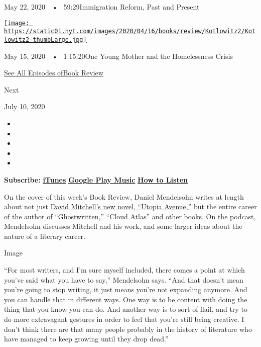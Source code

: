 May 22, 2020~~•~ 59:29Immigration Reform, Past and Present

\href{https://www.nytimes.com/2020/05/15/books/review/podcast-lauren-sandler-this-is-all-i-got-sarah-weinman-crime-fiction.html?action=click\&module=audio-series-bar\&region=header\&pgtype=Article}{\texttt{[image: https://static01.nyt.com/images/2020/04/16/books/review/Kotlowitz2/Kotlowitz2-thumbLarge.jpg]}}

May 15, 2020~~•~ 1:15:20One Young Mother and the Homelessness Crisis

\href{https://www.nytimes.com/column/book-review-podcast}{See All
Episodes ofBook Review}

Next

July 10, 2020

\begin{itemize}
\item
\item
\item
\item
\item
\end{itemize}

\textbf{Subscribe:}
\textbf{\href{https://itunes.apple.com/us/podcast/book-review/id120315179?mt=2}{iTunes}}
\textbf{\textbar{}}
\textbf{\href{https://play.google.com/music/listen?u=0\#/ps/Iv6zeb5qwjtzjfbyo3vy5zny5ky}{Google
Play Music}} \textbf{\textbar{}}
\textbf{\href{https://www.nytimes.com/2018/08/03/books/review/how-to-listen-to-the-book-review-podcast.html}{How
to Listen}}

On the cover of this week's Book Review, Daniel Mendelsohn writes at
length about not just
\href{https://www.nytimes.com/2020/07/10/books/review/utopia-avenue-david-mitchell.html}{David
Mitchell's new novel, ``Utopia Avenue,''} but the entire career of the
author of ``Ghostwritten,'' ``Cloud Atlas'' and other books. On the
podcast, Mendelsohn discusses Mitchell and his work, and some larger
ideas about the nature of a literary career.

Image

``For most writers, and I'm sure myself included, there comes a point at
which you've said what you have to say,'' Mendelsohn says. ``And that
doesn't mean you're going to stop writing, it just means you're not
expanding anymore. And you can handle that in different ways. One way is
to be content with doing the thing that you know you can do. And another
way is to sort of flail, and try to do more extravagant gestures in
order to feel that you're still being creative. I don't think there are
that many people probably in the history of literature who have managed
to keep growing until they drop dead.''

